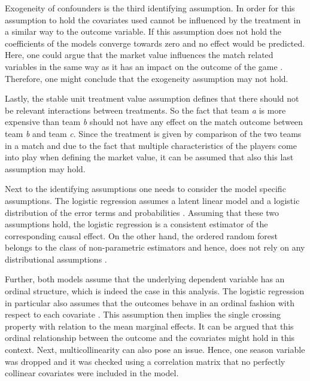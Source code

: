 \documentclass[11pt]{article}
\begin{document}
Exogeneity of confounders is the third identifying assumption. In order for this assumption to hold the covariates used cannot be influenced by the treatment in a similar way to the outcome variable. If this assumption does not hold the coefficients of the models converge towards zero and no effect would be predicted. Here, one could argue that the market value influences the match related variables in the same way as it has an impact on the outcome of the game \cite[p. 614]{muller2017}. Therefore, one might conclude that the exogeneity assumption may not hold.

Lastly, the stable unit treatment value assumption defines that there should not be relevant interactions between treatments. So the fact that team \textit{a} is more expensive than team \textit{b} should not have any effect on the match outcome between team \textit{b} and team \textit{c}. Since the treatment is given by comparison of the two teams in a match and due to the fact that multiple characteristics of the players come into play when defining the market value, it can be assumed that also this last assumption may hold.

Next to the identifying assumptions one needs to consider the model specific assumptions. The logistic regression assumes a latent linear model and a logistic distribution of the error terms and probabilities \cite[p. 519]{cameron}. Assuming that these two assumptions hold, the logistic regression is a consistent estimator of the corresponding causal effect. On the other hand, the ordered random forest belongs to the class of non-parametric estimators and hence, does not rely on any distributional assumptions \cite[p. 1]{lechner2019random}.

Further, both models assume that the underlying dependent variable has an ordinal structure, which is indeed the case in this analysis. The logistic regression in particular also assumes that the outcomes behave in an ordinal fashion with respect to each covariate \cite{regrmodels}. This assumption then implies the single crossing property with relation to the mean marginal effects. It can be argued that this ordinal relationship between the outcome and the covariates might hold in this context. Next, multicollinearity can also pose an issue. Hence, one season variable was dropped and it was checked using a correlation matrix that no perfectly collinear covariates were included in the model.

\end{document}
